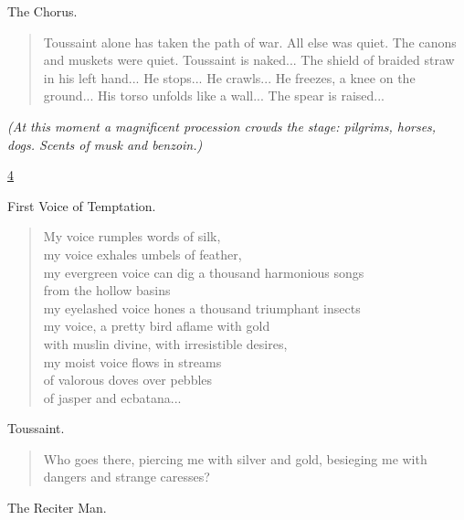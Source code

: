 \documentclass[letterpaper,article,12pt,oneside,notitlepage]{memoir}
\begin{document}
\begin{center}The Chorus.\end{center}

\begin{verse}
\indent Toussaint alone has taken the path of war. All else was quiet. The canons and muskets were quiet. Toussaint is naked... The shield of braided straw in his left hand... He stops... He crawls... He freezes, a knee on the ground... His torso unfolds like a wall... The spear is raised... \\
\end{verse}

\textit{(At this moment a magnificent procession crowds the stage: pilgrims, horses, dogs. Scents of musk and benzoin.)}

\clearpage

\href{http://cesaire.elotroalex.com/chiens/chiens/p004.html}{4}

\begin{center}First Voice of Temptation.\end{center}

\begin{verse}
My voice rumples words of silk, \\
my voice exhales umbels of feather, \\
my evergreen voice can dig a thousand harmonious songs \\
from the hollow basins \\
my eyelashed voice hones a thousand triumphant insects \\
my voice, a pretty bird aflame with gold \\
with muslin divine, with irresistible desires, \\
my moist voice flows in streams \\
of valorous doves over pebbles \\
of jasper and ecbatana... \\
\end{verse}

\begin{center}Toussaint.\end{center}

\begin{verse}
\indent Who goes there, piercing me with silver and gold, besieging me with dangers and strange caresses? \\
\end{verse}

\begin{center}The Reciter Man.\end{center}
\end{document}
